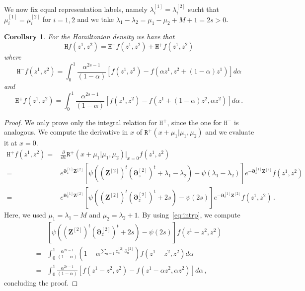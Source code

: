 \documentclass[11pt]{article}
\numberwithin{equation}{section}
\newtheorem{corollary}[theorem]{Corollary}
\newcommand{\M}{M}
\newcommand{\OT}{\bm{\partial}_z}
\newcommand{\OTD}{\bm{Z}}
\newcommand{\ecdR}{\mathtt{R}}
\newcommand{\ecdH}{\mathtt{H}}
\newcommand{\heat}{z}
\begin{document}
We now fix equal representation labels, namely $\lambda_{i}^{[1]}=\lambda_{i}^{[2]}$ sucht that  $\mu_{i}^{[1]}=\mu_{i}^{[2]}$  for $i=1,2$ and we take $\lambda_{1}-\lambda_{2}=\mu_1-\mu_2+M+1=2s>0$.
\begin{corollary}
    For the Hamiltonian density we have that 
    \begin{equation}
        \ecdH f(\heat^{1},\heat^{2})=\ecdH^{-}f(\heat^{1},\heat^{2})+\ecdH^{+}f(\heat^{1},\heat^{2})
    \end{equation}
    where
     \begin{equation}
        \ecdH^{-}f(\heat^{1},\heat^{2})=\int_{0}^{1}\frac{\alpha^{2s-1}}{(1-\alpha)}\left[f(\heat^{1},\heat^{2})-f(\alpha\heat^{1}, \heat^{2}+(1-\alpha)\heat^{1})\right]d\alpha
    \end{equation}
    and
    \begin{equation}
        \ecdH^{+}f(\heat^{1},\heat^{2})=\int_{0}^{1}\frac{\alpha^{2s-1}}{(1-\alpha)}\left[f(\heat^{1},\heat^{2})-f(\heat^{1}+(1-\alpha)\heat^{2},\alpha \heat^{2})\right]d\alpha\,.
    \end{equation}
\end{corollary}
\begin{proof}We only prove only the integral relation for $\ecdH^{+}$, since the one for $\ecdH^{-}$ is analogous. We compute the derivative in $x$ of $\ecdR^{+}(x+\mu_{1}|\mu_{1},\mu_{2})$ and we evaluate it at $x=0$. 
    \begin{equation}
        \begin{split}
            \ecdH^{+}f(\heat^{1},\heat^{2})=&\frac{\partial}{\partial x}\ecdR^{+}(x+\mu_{1}|\mu_{1},\mu_{2})\bigg|_{x=0}f(\heat^{1},\heat^{2})
                                          \\=&
           e^{\OT^{[1]}\OTD^{[2]}}\left[\psi((\OTD^{[2]})^t(\OT^{[2]})^t+\lambda_{1}-\lambda_{2})-\psi(\lambda_{1}-\lambda_{2})\right]e^{-\OT^{[1]}\OTD^{[2]}}f(\heat^{1},\heat^{2})
                \\=
            &e^{\OT^{[1]}\OTD^{[2]}}\left[\psi((\OTD^{[2]})^t(\OT^{[2]})^t+2s)-\psi(2s)\right]e^{-\OT^{[1]}\OTD^{[2]}}f(\heat^{1},\heat^{2})\,.
        \end{split}
    \end{equation}
    Here, we used $\mu_{1}=\lambda_{1}-\M$ and $\mu_{2}=\lambda_{2}+1$.
By using~\eqref{eq:intrp}, we compute 
\begin{equation}
\begin{split}
    &\left[\psi((\OTD^{[2]})^t(\OT^{[2]})^t+2s)-\psi(2s)\right]f(\heat^{1}-\heat^{2},\heat^{2})
    \\=&\int_{0}^{1}\frac{\alpha^{2s-1}}{(1-\alpha)}(1-\alpha^{\sum_{a=1}\heat_{a}^{[2]}\partial_{a}^{[2]}})f(\heat^{1}-\heat^{2},\heat^{2})d\alpha
    \\=&\int_{0}^{1}\frac{\alpha^{2s-1}}{(1-\alpha)}\left[f(\heat^{1}-\heat^{2},\heat^{2})-f(\heat^{1}-\alpha\heat^{2},\alpha \heat^{2})\right]d\alpha\,,
    \end{split}
\end{equation}
concluding the proof. 
\end{proof}
\end{document}
